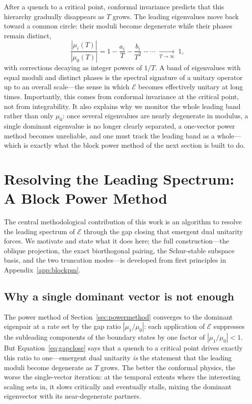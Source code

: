 After a quench to a critical point, conformal invariance predicts that this hierarchy gradually disappears as $T$ grows. The leading eigenvalues move back toward a common circle: their moduli become degenerate while their phases remain distinct,
\begin{equation}
    \frac{|\mu_i(T)|}{|\mu_0(T)|}
        = 1 - \frac{a_i}{T} - \frac{b_i}{T^2} - \cdots
        \;\xrightarrow[T\to\infty]{}\; 1,
    \label{eq:gapclose}
\end{equation}
with corrections decaying as integer powers of $1/T$. A band of eigenvalues with equal moduli and distinct phases is the spectral signature of a unitary operator up to an overall scale---the sense in which $\mathcal{E}$ becomes effectively unitary at long times. Importantly, this comes from conformal invariance at the critical point, not from integrability. It also explains why we monitor the whole leading band rather than only $\mu_0$: once several eigenvalues are nearly degenerate in modulus, a single dominant eigenvalue is no longer clearly separated, a one-vector power method becomes unreliable, and one must track the leading band as a whole---which is exactly what the block power method of the next section is built to do.

\section{Resolving the Leading Spectrum: A Block Power Method}
\label{sec:blockpm}

The central methodological contribution of this work is an algorithm to resolve the leading spectrum of $\mathcal{E}$ through the gap closing that emergent dual unitarity forces. We motivate and state what it does here; the full construction---the oblique projection, the exact biorthogonal pairing, the Schur-stable subspace basis, and the two truncation modes---is developed from first principles in Appendix~\ref{app:blockpm}.

\subsection{Why a single dominant vector is not enough}

The power method of Section~\ref{sec:powermethod} converges to the dominant eigenpair at a rate set by the gap ratio $|\mu_1/\mu_0|$: each application of $\mathcal{E}$ suppresses the subleading components of the boundary states by one factor of $|\mu_1/\mu_0|<1$. But Equation~\eqref{eq:gapclose} says that a quench to a critical point drives exactly this ratio to one---emergent dual unitarity \emph{is} the statement that the leading moduli become degenerate as $T$ grows. The better the conformal physics, the worse the single-vector iteration: at the temporal extents where the interesting scaling sets in, it slows critically and eventually stalls, mixing the dominant eigenvector with its near-degenerate partners.

